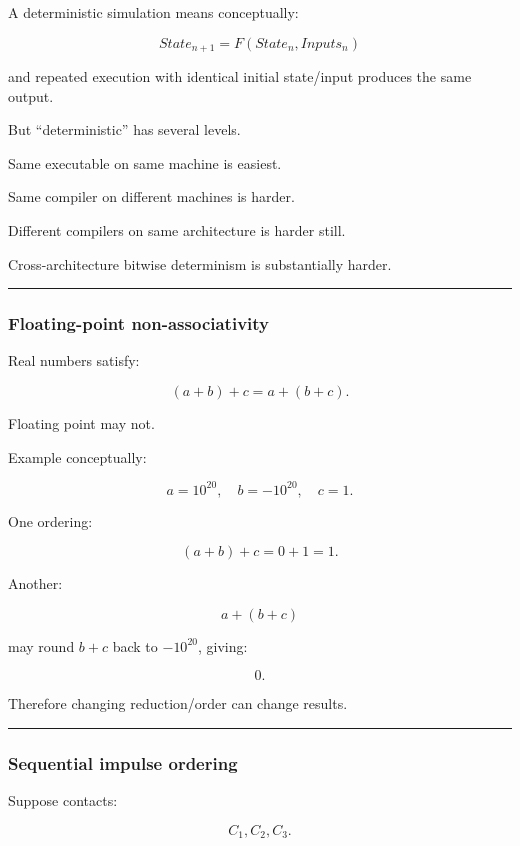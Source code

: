 A deterministic simulation means conceptually:

\[
\boxed{
State_{n+1}
=
F(State_n,Inputs_n)
}
\]

and repeated execution with identical initial state/input produces the same output.

But ``deterministic'' has several levels.

Same executable on same machine is easiest.

Same compiler on different machines is harder.

Different compilers on same architecture is harder still.

Cross-architecture bitwise determinism is substantially harder.

\begin{center}\rule{0.5\linewidth}{0.5pt}\end{center}

\subsubsection{Floating-point non-associativity}\label{floating-point-non-associativity}

Real numbers satisfy:

\[
(a+b)+c
=
a+(b+c).
\]

Floating point may not.

Example conceptually:

\[
a=10^{20},
\quad
b=-10^{20},
\quad
c=1.
\]

One ordering:

\[
(a+b)+c
=
0+1
=
1.
\]

Another:

\[
a+(b+c)
\]

may round \(b+c\) back to \(-10^{20}\), giving:

\[
0.
\]

Therefore changing reduction/order can change results.

\begin{center}\rule{0.5\linewidth}{0.5pt}\end{center}

\subsubsection{Sequential impulse ordering}\label{sequential-impulse-ordering}

Suppose contacts:

\[
C_1,C_2,C_3.
\]

